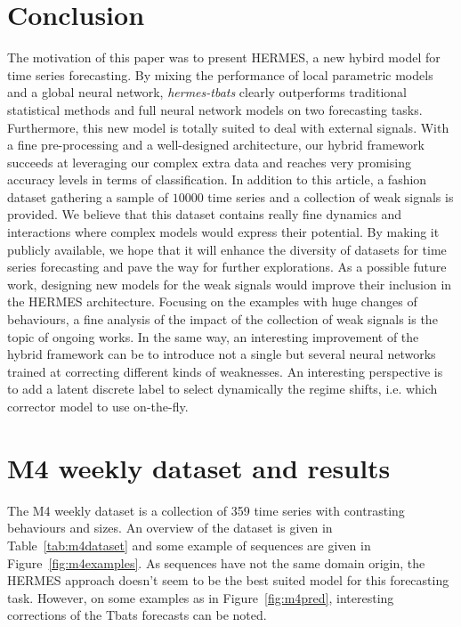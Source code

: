 \documentclass[lettersize,journal]{IEEEtran}
\newcommand{\numberts}{10000}
\begin{document}
\section{Conclusion}
\label{sec:conclusion}
The motivation of this paper was to present HERMES, a new hybird model for time series forecasting. By mixing the performance of local parametric models and a global neural network, \textit{hermes-tbats} clearly outperforms traditional statistical methods and full neural network models on two forecasting tasks. Furthermore, this new model is totally suited to deal with external signals. With a fine pre-processing and a well-designed architecture, our hybrid framework succeeds at leveraging our complex extra data and reaches very promising accuracy levels in terms of classification. In addition to this article, a fashion dataset gathering a sample of $\numberts$ time series and a collection of weak signals is provided. We believe that this dataset contains really fine dynamics and interactions where complex models would express their potential. By making it publicly available, we hope that it will enhance the diversity of datasets for time series forecasting and pave the way for further explorations.
As a possible future work, designing new models for the weak signals would improve their inclusion  in the HERMES architecture. Focusing on the examples with huge changes of behaviours, a fine analysis of the impact of the collection of weak signals is the topic of ongoing works. In the same way, an interesting improvement of the hybrid framework can be to introduce not a single but several neural networks trained at correcting different kinds of weaknesses. An interesting perspective is to add a latent discrete label to select dynamically the regime shifts, i.e. which corrector model to use on-the-fly. 


\appendices



\section{M4 weekly dataset and results}
\label{sec:m4overview}


The M4 weekly dataset is a collection of 359 time series with  contrasting behaviours and sizes. An overview of the dataset is given in Table~\ref{tab:m4dataset} and some example of sequences are given in Figure~\ref{fig:m4examples}. As sequences have not the same domain origin, the HERMES approach doesn't seem to be the best suited model for this forecasting task. However, on some examples as in Figure~\ref{fig:m4pred}, interesting corrections of the Tbats forecasts can be noted.
\end{document}
